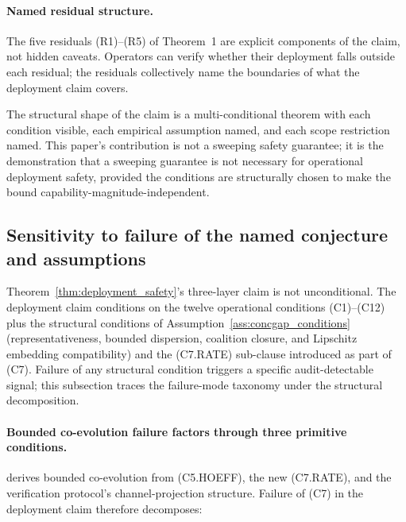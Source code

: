 \paragraph{Named residual structure.}
The five residuals (R1)--(R5) of Theorem~1 are explicit components
of the claim, not hidden caveats.  Operators can verify whether
their deployment falls outside each residual; the residuals
collectively name the boundaries of what the deployment claim
covers.

The structural shape of the claim is a multi-conditional theorem
with each condition visible, each empirical assumption named, and
each scope restriction named.  This paper's contribution is not a
sweeping safety guarantee; it is the demonstration that a sweeping
guarantee is not necessary for operational deployment safety,
provided the conditions are structurally chosen to make the bound
capability-magnitude-independent.

\subsection{Sensitivity to failure of the named conjecture and assumptions}
\label{sec:disc_sensitivity}

Theorem~\ref{thm:deployment_safety}'s three-layer claim is not
unconditional. The deployment claim conditions on the twelve
operational conditions (C1)--(C12) plus the structural conditions
of Assumption~\ref{ass:concgap_conditions} (representativeness,
bounded dispersion, coalition closure, and Lipschitz embedding
compatibility) and the (C7.RATE) sub-clause introduced as part
of (C7). Failure of any structural condition triggers a specific
audit-detectable signal; this subsection traces the failure-mode
taxonomy under the structural decomposition.

\paragraph{Bounded co-evolution failure factors through three primitive conditions.}
\citep[Theorem~1]{lasser2026foundations} derives bounded
co-evolution from (C5.HOEFF), the new (C7.RATE), and the
verification protocol's channel-projection structure.  Failure of
(C7) in the deployment claim therefore decomposes:

